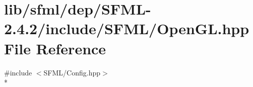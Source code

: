 \hypertarget{sfml_2dep_2_s_f_m_l-2_84_82_2include_2_s_f_m_l_2_open_g_l_8hpp}{\section{lib/sfml/dep/\-S\-F\-M\-L-\/2.4.2/include/\-S\-F\-M\-L/\-Open\-G\-L.hpp File Reference}
\label{sfml_2dep_2_s_f_m_l-2_84_82_2include_2_s_f_m_l_2_open_g_l_8hpp}
}
{\ttfamily \#include $<$S\-F\-M\-L/\-Config.\-hpp$>$}\\*
